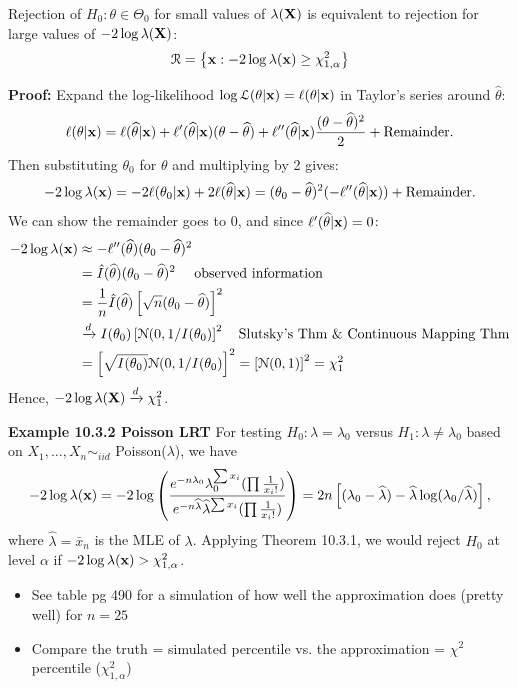 \documentclass[11pt,]{article}
\newcommand{\Xndots}{X_1, \ldots, X_n}
\def\bx{{\bf x}}
\def\bX{{\bf X}}
\def\thetahat{{\widehat\theta}}
\def\lambdahat{{\widehat\lambda}}
\def\xbar{\bar{ x}}
\def\Lsc{{\cal L}}
\def\Nsc{{\cal N}}
\def\Rsc{{\cal R}}
\begin{document}
Rejection of \(H_0 : \theta \in \Theta_0\) for small values of
\(\lambda(\bX)\) is equivalent to rejection for large values of
\(-2 \log \lambda(\bX)\):
\[\Rsc =  \left\{\bx: -2 \log \lambda(\bx) \geq \chi_{1,\alpha}^2\right\}\]

\noindent\textbf{Proof:} Expand the log-likelihood
\(\log \Lsc(\theta|\bx) = \ell(\theta|\bx)\) in Taylor's series around
\(\thetahat\):
\[\ell(\theta|\bx) = \ell(\thetahat |\bx) + \ell^\prime(\thetahat|\bx)(\theta - \thetahat) + \ell^{\prime\prime}(\thetahat|\bx)\frac{(\theta - \thetahat)^2}{2} +  \mbox{Remainder}.\]
Then substituting \(\theta_0\) for \(\theta\) and multiplying by 2
gives:
\[-2 \log \lambda(\bx) = -2 \ell(\theta_0 | \bx) + 2 \ell(\thetahat | \bx) = (\theta_0 - \thetahat)^2(-\ell^{\prime\prime}(\thetahat|\bx)) + \mbox{Remainder}.\]
We can show the remainder goes to 0, and since
\(\ell^\prime(\thetahat|\bx) = 0\): \begin{align*}
-2\log\lambda(\bx) &\approx -\ell^{\prime\prime}(\thetahat)(\theta_0 - \thetahat)^2 \\
&=  \hat{I}(\thetahat)(\theta_0 - \thetahat)^2 \quad \mbox{ observed information}\\
&= \frac{1}{n}\hat{I}(\thetahat) \left[ \sqrt{n}(\theta_0 - \thetahat)\right]^2\\
&\xrightarrow{d} I(\theta_0) \left[\Nsc(0, 1/I(\theta_0)\right]^2 \quad \mbox{Slutsky's Thm \& Continuous Mapping Thm}\\
&= \left[\sqrt{I(\theta_0) }\Nsc(0, 1/I(\theta_0)\right]^2 = \left[\Nsc(0,1)\right]^2 = \chi^2_1
\end{align*} Hence, \(-2 \log \lambda(\bX) \xrightarrow{d} \chi^2_1\).

\noindent\textbf{Example 10.3.2 Poisson LRT} For testing
\(H_0: \lambda = \lambda_0\) versus \(H_1: \lambda \neq \lambda_0\)
based on \(\Xndots \sim_{iid}\) Poisson(\(\lambda\)), we have
\[-2 \log \lambda(\bx) = -2 \log \left(  
\frac{e^{-n \lambda_0} \lambda_0^{\sum x_i}(\prod\frac{1}{x_i!})}
{e^{-n \lambdahat} \lambdahat^{\sum x_i}(\prod\frac{1}{x_i!})}\right) = 2n \left[(\lambda_0 - \lambdahat) - \lambdahat \log(\lambda_0/\lambdahat) \right],\]
where \(\lambdahat = \xbar_n\) is the MLE of \(\lambda\). Applying
Theorem 10.3.1, we would reject \(H_0\) at level \(\alpha\) if
\(-2\log \lambda(\bx) > \chi^2_{1,\alpha}\).

\begin{itemize}
\item See table pg 490 for a simulation of how well the approximation does (pretty well) for $n=25$
\item Compare the truth = simulated percentile vs. the approximation = $\chi^2$ percentile ($\chi^2_{1,\alpha}$)
\end{itemize}
\end{document}
